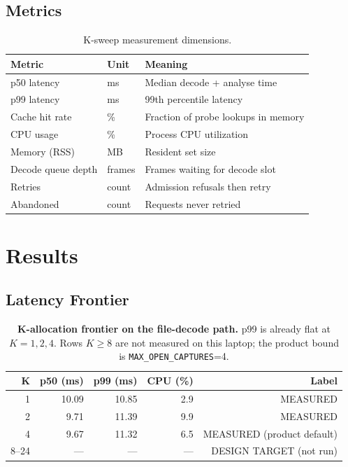 \documentclass[sigconf,review]{acmart}
\begin{document}
\subsection{Metrics}

\begin{table}[h]
  \centering
  \small
  \begin{tabular}{lll}
    \toprule
    \textbf{Metric} & \textbf{Unit} & \textbf{Meaning} \\
    \midrule
    p50 latency & ms & Median decode + analyse time \\
    p99 latency & ms & 99th percentile latency \\
    Cache hit rate & \% & Fraction of probe lookups in memory \\
    CPU usage & \% & Process CPU utilization \\
    Memory (RSS) & MB & Resident set size \\
    Decode queue depth & frames & Frames waiting for decode slot \\
    Retries & count & Admission refusals then retry \\
    Abandoned & count & Requests never retried \\
    \bottomrule
  \end{tabular}
  \caption{K-sweep measurement dimensions.}
  \label{tab:metrics}
\end{table}

\section{Results}

\subsection{Latency Frontier}

\begin{table}[h]
  \centering
  \small
  \begin{tabular}{rrrrr}
    \toprule
    \textbf{K} & \textbf{p50 (ms)} & \textbf{p99 (ms)} & \textbf{CPU (\%)} & \textbf{Label} \\
    \midrule
    1 & 10.09 & 10.85 & 2.9 & MEASURED \\
    2 & 9.71 & 11.39 & 9.9 & MEASURED \\
    4 & 9.67 & 11.32 & 6.5 & MEASURED (product default) \\
    8--24 & --- & --- & --- & DESIGN TARGET (not run) \\
    \bottomrule
  \end{tabular}
  \caption{\textbf{K-allocation frontier on the file-decode path.} p99 is already flat at $K=1,2,4$. Rows $K\ge 8$ are not measured on this laptop; the product bound is \texttt{MAX\_OPEN\_CAPTURES}=4.}
  \label{tab:frontier}
\end{table}
\end{document}
